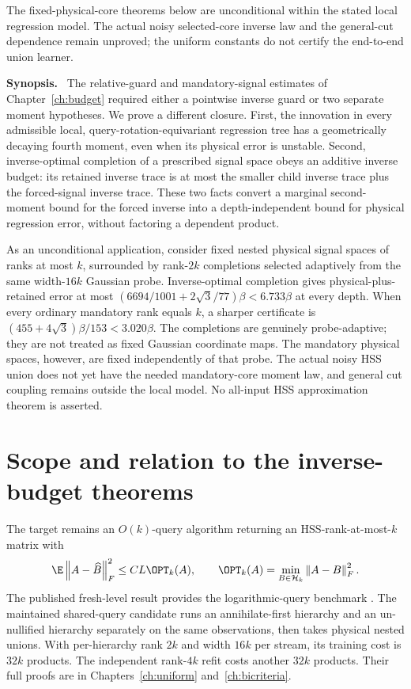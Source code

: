 \documentclass[11pt,oneside,openany,a4paper]{book}
\numberwithin{equation}{chapter}
\theoremstyle{definition}
\theoremstyle{remark}
\newenvironment{chaptersynopsis}{\begingroup\small\textbf{Synopsis.}\ }{\par\endgroup\medskip}
\newcommand{\F}[1]{\left\lVert#1\right\rVert_F}
\begin{document}
\begin{scopebox}
The fixed-physical-core theorems below are unconditional within the stated local regression model. The actual noisy selected-core inverse law and the general-cut dependence remain unproved; the uniform constants do not certify the end-to-end union learner.
\end{scopebox}
\thispagestyle{plain}
\begin{chaptersynopsis}
The relative-guard and mandatory-signal estimates of Chapter~\ref{ch:budget} required either a pointwise inverse guard or two separate moment hypotheses. We prove a different closure. First, the innovation in every admissible local, query-rotation-equivariant regression tree has a geometrically decaying fourth moment, even when its physical error is unstable. Second, inverse-optimal completion of a prescribed signal space obeys an additive inverse budget: its retained inverse trace is at most the smaller child inverse trace plus the forced-signal inverse trace. These two facts convert a marginal second-moment bound for the forced inverse into a depth-independent bound for physical regression error, without factoring a dependent product.

As an unconditional application, consider fixed nested physical signal spaces of ranks at most $k$, surrounded by rank-$2k$ completions selected adaptively from the same width-$16k$ Gaussian probe. Inverse-optimal completion gives physical-plus-retained error at most $(6694/1001+2\sqrt3/77)\beta<6.733\beta$ at every depth. When every ordinary mandatory rank equals $k$, a sharper certificate is $(455+4\sqrt3)\beta/153<3.020\beta$. The completions are genuinely probe-adaptive; they are not treated as fixed Gaussian coordinate maps. The mandatory physical spaces, however, are fixed independently of that probe. The actual noisy HSS union does not yet have the needed mandatory-core moment law, and general cut coupling remains outside the local model. No all-input HSS approximation theorem is asserted.
\end{chaptersynopsis}


\section{Scope and relation to the inverse-budget theorems}
The target remains an $O(k)$-query algorithm returning an HSS-rank-at-most-$k$ matrix with
\[
 \E\F{A-\widehat B}^2\le CL\OPT_k(A),\qquad
 \OPT_k(A)=\min_{B\in\mathcal H_k}\F{A-B}^2.
\]
The published fresh-level result provides the logarithmic-query benchmark \cite{AmselHSS}. The maintained shared-query candidate runs an annihilate-first hierarchy and an un-nullified hierarchy separately on the same observations, then takes physical nested unions. With per-hierarchy rank $2k$ and width $16k$ per stream, its training cost is $32k$ products. The independent rank-$4k$ refit costs another $32k$ products. Their full proofs are in Chapters~\ref{ch:uniform} and~\ref{ch:bicriteria}.
\end{document}
